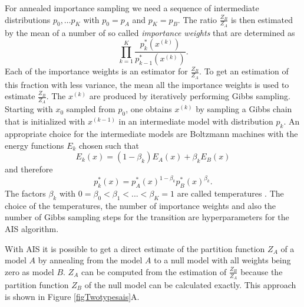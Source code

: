 \documentclass[12pt]{article}
\begin{document}
For annealed importance sampling we need a sequence of intermediate distributions
$p_0, \dots p_K$ with
$p_0 = p_A$ and $p_K = p_B$. The ratio $\frac{Z_B}{Z_A}$ is then estimated by the mean of a number of so called {\em importance weights} that are determined as
\[
   \prod_{k=1}^K \frac{p^*_k(x^{(k)})}{p^*_{k-1}(x^{(k)})}.
\]
Each of the importance weights is an estimator for $\frac{Z_B}{Z_A}$.
To get an estimation of this fraction with less variance, the mean all the importance weights is used to estimate  $\frac{Z_B}{Z_A}$.
The $x^{(k)}$ are produced by iteratively performing Gibbs sampling. Starting with $x_0$ sampled from $p_0$, one obtains $x^{(k)}$ by sampling a Gibbs chain that is initialized with $x^{(k-1)}$ in an intermediate model with distribution $p_k$. An appropriate choice for the intermediate models are Boltzmann machines with the energy functions $E_k$ chosen such that
\[
   E_k(x) = (1 - \beta_k) E_A(x) + \beta_k E_B(x)
\]
and therefore
\[
   p_k^*(x) = p_A^*(x)^{1-\beta_k} p_B^*(x)^{\beta_k}.
\]
The factors $\beta_k$ with $0 = \beta_0 < \beta_1 < ... < \beta_K = 1$ are called temperatures \citep{salakhutdinov2008learning}.
The choice of the temperatures, the number of importance weights and also the number of Gibbs sampling steps for the transition are hyperparameters for the AIS algorithm.

With AIS it is possible to get a direct estimate of the partition function $Z_A$ of a model $A$ by annealing from the model $A$ to a null model with all weights being zero as model $B$.
$Z_A$ can be computed from the estimation of $\frac{Z_B}{Z_A}$ because the partition function $Z_B$ of the null model can be calculated exactly. This approach is shown in Figure \ref{figTwotypesais}A.
\end{document}

